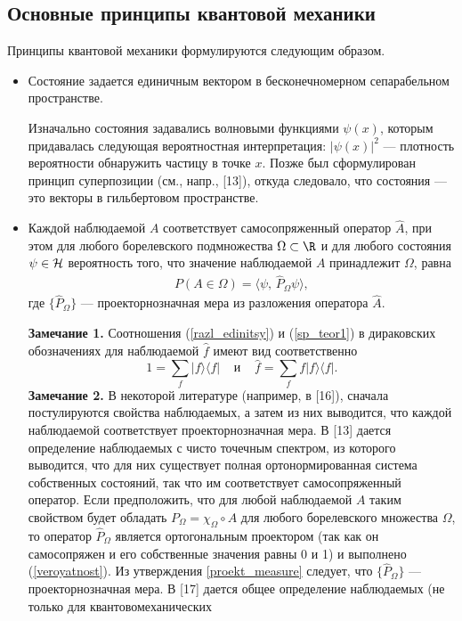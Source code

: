 \documentclass[a4paper
]{article}
\begin{document}
\subsection{Основные принципы квантовой механики}
\label{principles}
Принципы квантовой механики формулируются следующим образом.
\begin{itemize}
\item Состояние задается единичным вектором в бесконечномерном сепарабельном
пространстве. \par
Изначально состояния задавались волновыми функциями $\psi(x)$, которым
придавалась следующая вероятностная интерпретация: $|\psi(x)|^2$ ---
плотность вероятности обнаружить частицу в точке $x$. Позже был
сформулирован принцип суперпозиции (см., напр., [13]), откуда следовало,
что состояния --- это векторы в гильбертовом пространстве.
\item Каждой наблюдаемой $A$ соответствует самосопряженный оператор
$\hat A$, при этом для любого борелевского подмножества $\Omega\subset
\R$ и для любого состояния $\psi\in {\cal H}$ вероятность того, что значение наблюдаемой $A$
принадлежит $\Omega$, равна
\begin{align}
\label{veroyatnost}
P(A\in \Omega)=\langle \psi, \, \hat P_{\Omega}\psi\rangle,
\end{align}
где $\{\hat P_{\Omega}\}$ --- проекторнозначная мера из разложения оператора
$\hat A$. \par
{\bf Замечание 1.} Соотношения (\ref{razl_edinitsy}) и (\ref{sp_teor1})
в дираковских обозначениях для наблюдаемой $\hat f$ имеют вид
соответственно $$1=\sum \limits_f|f\rangle \langle f| \; \; \; \; \text{и} \; \;
\; \; \hat f=\sum \limits_f f|f\rangle \langle f|.$$
{\bf Замечание 2.} В некоторой литературе (например, в [16]), сначала
постулируются свойства наблюдаемых, а затем из них выводится,
что каждой наблюдаемой соответствует проекторнозначная мера. В [13]
дается определение наблюдаемых с чисто точечным спектром, из которого
выводится, что для них существует полная ортонормированная система
собственных состояний, так что им соответствует самосопряженный оператор.
Если предположить, что для любой наблюдаемой $A$ таким свойством будет
обладать $P_\Omega=\chi_\Omega\circ A$ для любого борелевского
множества $\Omega$, то оператор $\hat P_{\Omega}$ является ортогональным
проектором (так как он самосопряжен и его собственные значения равны 0 и 1)
и выполнено (\ref{veroyatnost}). Из утверждения \ref{proekt_measure}
следует, что $\{\hat P_{\Omega}\}$ --- проекторнозначная мера. В [17]
дается общее определение наблюдаемых (не только для квантовомеханических

\end{itemize}
\end{document}
